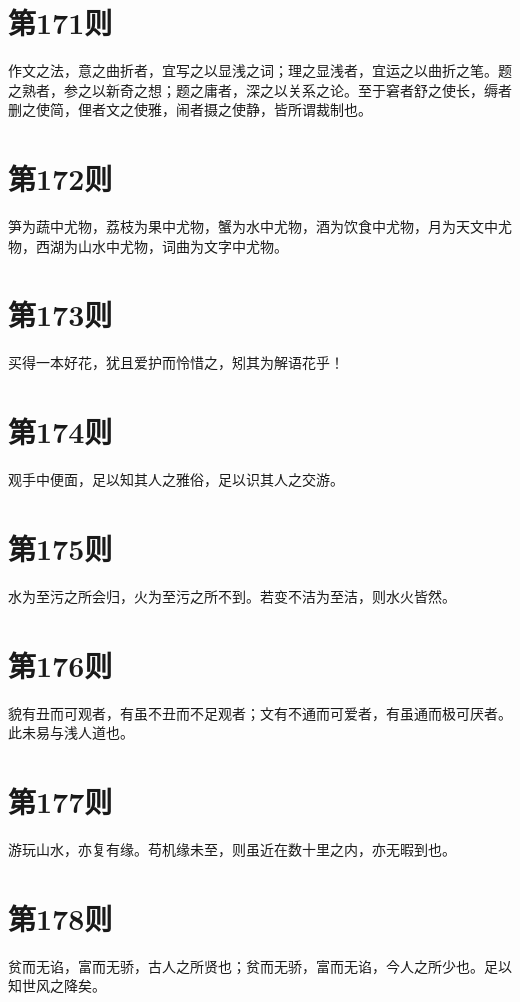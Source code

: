\documentclass[12pt,a4paper]{ctexbook}
\begin{document}
\section{第171则}
作文之法，意之曲折者，宜写之以显浅之词；理之显浅者，宜运之以曲折之笔。题之熟者，参之以新奇之想；题之庸者，深之以关系之论。至于窘者舒之使长，缛者删之使简，俚者文之使雅，闹者摄之使静，皆所谓裁制也。\par

\section{第172则}
笋为蔬中尤物，荔枝为果中尤物，蟹为水中尤物，酒为饮食中尤物，月为天文中尤物，西湖为山水中尤物，词曲为文字中尤物。\par

\section{第173则}
买得一本好花，犹且爱护而怜惜之，矧其为解语花乎！\par

\section{第174则}
观手中便面，足以知其人之雅俗，足以识其人之交游。\par

\section{第175则}
水为至污之所会归，火为至污之所不到。若变不洁为至洁，则水火皆然。\par

\section{第176则}
貌有丑而可观者，有虽不丑而不足观者；文有不通而可爱者，有虽通而极可厌者。此未易与浅人道也。\par

\section{第177则}
游玩山水，亦复有缘。苟机缘未至，则虽近在数十里之内，亦无暇到也。\par

\section{第178则}
贫而无谄，富而无骄，古人之所贤也；贫而无骄，富而无谄，今人之所少也。足以知世风之降矣。\par
\end{document}
